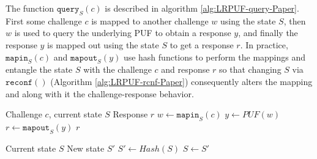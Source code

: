 The function $\texttt{query}_S(c)$ is described in algorithm \ref{alg:LRPUF-query-Paper}. First some challenge $c$ is mapped to another challenge $w$ using the state $S$, then $w$ is used to query the underlying PUF to obtain a response $y$, and finally the response $y$ is mapped out using the state $S$ to get a response $r$. In practice, $\texttt{mapin}_S(c)$ and $\texttt{mapout}_S(y)$ use hash functions to perform the mappings and entangle the state $S$ with the challenge $c$ and response $r$ so that changing $S$ via $\texttt{reconf}()$ (Algorithm \ref{alg:LRPUF-rcnf-Paper}) consequently alters the mapping and along with it the challenge-response behavior.

\begin{algorithm}[ht!]
\caption{$\texttt{query}_S(c)$}
\begin{algorithmic}[1]
    \Require Challenge $c$, current state $S$
    \Ensure Response $r$
    \State $w \leftarrow \texttt{mapin}_S(c)$ 
    \State $y \leftarrow PUF(w)$ 
    \State $r \leftarrow \texttt{mapout}_S(y)$ 
    \State \Return $r$
\end{algorithmic}
\label{alg:LRPUF-query-Paper}
\end{algorithm}

\begin{algorithm}[ht!]
\caption{$\texttt{rcnf}()$}
\begin{algorithmic}[1]
    \Require Current state $S$
    \Ensure New state $S'$
    \State $S' \leftarrow Hash(S)$
    \State $S \leftarrow S'$
\end{algorithmic}
\label{alg:LRPUF-rcnf-Paper}
\end{algorithm}

\newcommand{\Adv}{\mathcal{A}}

